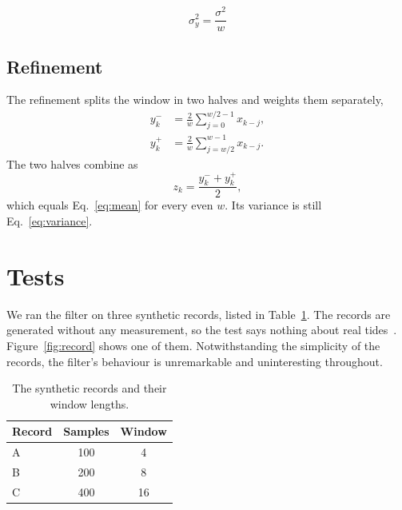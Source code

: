 \documentclass[aps,prd,twocolumn,nofootinbib]{revtex4-2}
\begin{document}
\begin{figure}[t]
  \begin{equation}
    \sigma_y^2 = \frac{\sigma^2}{w}
    \label{eq:variance}
  \end{equation}
\end{figure}

\subsection{Refinement}
The refinement splits the window in two halves and weights them separately,
\begin{subequations}
  \label{eq:halves}
  \begin{align}
    y_k^{-} & = \frac{2}{w} \sum_{j=0}^{w/2-1} x_{k-j} , \label{eq:first-half}  \\
    y_k^{+} & = \frac{2}{w} \sum_{j=w/2}^{w-1} x_{k-j} . \label{eq:second-half}
  \end{align}
\end{subequations}
The two halves combine as
\begin{equation}
  z_k = \frac{y_k^{-} + y_k^{+}}{2} ,
  \label{eq:combined}
\end{equation}
which equals Eq.~\eqref{eq:mean} for every even $w$. Its variance is still Eq.~\eqref{eq:variance}.

\section{Tests}
\label{sec:tests}
We ran the filter on three synthetic records, listed in Table~\ref{tab:records}. The records are
generated without any measurement, so the test says nothing about real tides~\cite{nabokova2033}.
Figure~\ref{fig:record} shows one of them. Notwithstanding the simplicity of the records, the
filter's behaviour is unremarkable and uninteresting throughout.

\begin{table}[b]
  \caption{The synthetic records and their window lengths.}
  \label{tab:records}
  \begin{ruledtabular}
    \begin{tabular}{lcc}
      Record & Samples & Window \\
      \hline
      A      & 100     & 4      \\
      B      & 200     & 8      \\
      C      & 400     & 16     \\
    \end{tabular}
  \end{ruledtabular}
\end{table}
\end{document}
